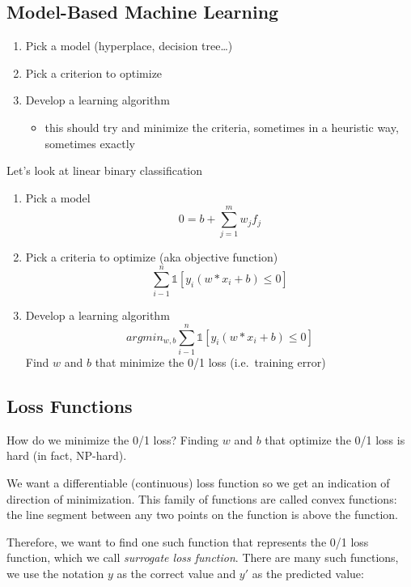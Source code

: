 \documentclass{article}
\begin{document}
\subsection{Model-Based Machine
Learning}\label{model-based-machine-learning}

\begin{enumerate}
\def\labelenumi{\arabic{enumi}.}
\tightlist
\item
  Pick a model (hyperplace, decision tree\ldots)
\item
  Pick a criterion to optimize
\item
  Develop a learning algorithm

  \begin{itemize}
  \tightlist
  \item
    this should try and minimize the criteria, sometimes in a heuristic
    way, sometimes exactly
  \end{itemize}
\end{enumerate}

Let's look at linear binary classification

\begin{enumerate}
\def\labelenumi{\arabic{enumi}.}
\tightlist
\item
  Pick a model \[0 = b + \sum_{j=1}^{m}w_jf_j\]
\item
  Pick a criteria to optimize (aka objective function)
  \[\sum_{i-1}^{n}\mathbb{1}[y_i(w*x_i+b) \le 0]\]
\item
  Develop a learning algorithm
  \[argmin_{w, b}\sum_{i-1}^{n}\mathbb{1}[y_i(w*x_i+b) \le 0]\] Find
  \(w\) and \(b\) that minimize the 0/1 loss (i.e.~training error)
\end{enumerate}

\subsection{Loss Functions}\label{loss-functions}

How do we minimize the 0/1 loss? Finding \(w\) and \(b\) that optimize
the 0/1 loss is hard (in fact, NP-hard).

We want a differentiable (continuous) loss function so we get an
indication of direction of minimization. This family of functions are
called convex functions: the line segment between any two points on the
function is above the function.

Therefore, we want to find one such function that represents the 0/1
loss function, which we call \emph{surrogate loss function}. There are
many such functions, we use the notation \(y\) as the correct value and
\(y'\) as the predicted value:
\end{document}
